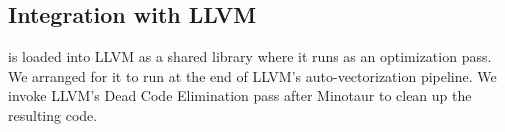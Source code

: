 \subsection{Integration with LLVM}

\minotaur{} is loaded into LLVM as a shared library where it runs as an
optimization pass.
%
We arranged for it to run at the end of LLVM's auto-vectorization pipeline.
%
We invoke LLVM's Dead Code Elimination pass after Minotaur to
clean up the resulting code.

